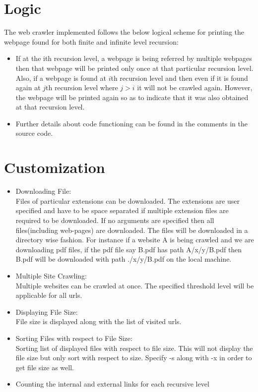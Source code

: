 \documentclass{article}
\begin{document}
\section{Logic}
The web crawler implemented follows the below logical scheme for printing the webpage found for both finite and infinite level recursion: \\ 
\begin{itemize}
\item{If at the ith recursion level, a webpage is being referred by multiple webpages then that webpage will be printed only once at that particular recursion level. Also, if a webpage is found at $i$th recursion level and then even if it is found again at $j$th recursion level where $j > i$ it will not be crawled again. However, the webpage will be printed again so as to indicate that it was also obtained at that recursion level.}
\item{Further details about code functioning can be found in the comments in the source code.}
\end{itemize}
\section{Customization}
\begin{itemize}
\item{Downloading File: \\
Files of particular extensions can be downloaded. The extensions are user specified and have to be space separated if multiple extension files are required to be downloaded.  If no arguments are specified then all files(including web-pages) are downloaded. The files will be downloaded in a directory wise fashion. For instance if a website A is being crawled and we are downloading pdf files, if the pdf file say B.pdf has path A/x/y/B.pdf then B.pdf will be downloaded with path ./x/y/B.pdf on the local machine.
}
\item{Multiple Site Crawling: \\
Multiple websites can be crawled at once. The specified threshold level will be applicable for all urls.
}
\item{Displaying File Size: \\
File size is displayed along with the list of visited urls.
}
\item{Sorting Files with respect to File Size: \\
Sorting list of displayed files with respect to file size. This will not display the file size but only sort with respect to size. Specify -s along with -x in order to get file size as well.
}
\item{Counting the internal and external links for each recursive level
}
\end{itemize}
\end{document}
